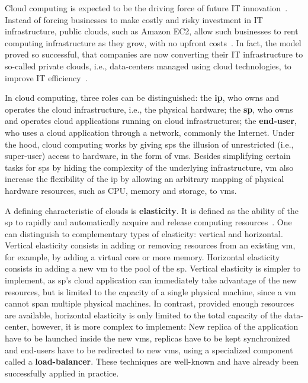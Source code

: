 Cloud computing is expected to be the driving force of future IT innovation~\cite{WPonMckinsey13}. Instead of forcing businesses to make costly and risky investment in IT infrastructure, public clouds, such as Amazon EC2, allow such businesses to rent computing infrastructure as they grow, with no upfront costs~\cite{Buyya09:FGCS}. In fact, the model proved so successful, that companies are now converting their IT infrastructure to so-called private clouds, i.e., data-centers managed using cloud technologies, to improve IT efficiency~\cite{Gulati11:HotCloud}.

In cloud computing, three roles can be distinguished: the {\bf\ac{ip}}, who owns and operates the cloud infrastructure, i.e., the physical hardware; the {\bf\ac{sp}}, who owns and operates cloud applications running on cloud infrastructures; the {\bf end-user}, who uses a cloud application through a network, commonly the Internet. Under the hood, cloud computing works by giving \acp{sp} the illusion of unrestricted (i.e., super-user) access to hardware, in the form of \acp{vm}. Besides simplifying certain tasks for \acp{sp} by hiding the complexity of the underlying infrastructure, \ac{vm} also increase the flexibility of the \ac{ip} by allowing an arbitrary mapping of physical hardware resources, such as CPU, memory and storage, to \acp{vm}.

A defining characteristic of clouds is {\bf elasticity}. It is defined as the ability of the \ac{sp} to rapidly and automatically acquire and release computing resources~\cite{Herbst13:ICAC}. One can distinguish to complementary types of elasticity: vertical and horizontal. Vertical elasticity consists in adding or removing resources from an existing \ac{vm}, for example, by adding a virtual core or more memory. Horizontal elasticity consists in adding a new \ac{vm} to the pool of the \ac{sp}. Vertical elasticity is simpler to implement, as \ac{sp}'s cloud application can immediately take advantage of the new resources, but is limited to the capacity of a single physical machine, since a \ac{vm} cannot span multiple physical machines. In contrast, provided enough resources are available, horizontal elasticity is only limited to the total capacity of the data-center, however, it is more complex to implement: New replica of the application have to be launched inside the new \acp{vm}, replicas have to be kept synchronized and end-users have to be redirected to new \acp{vm}, using a specialized component called a {\bf load-balancer}. These techniques are well-known and have already been successfully applied in practice.

